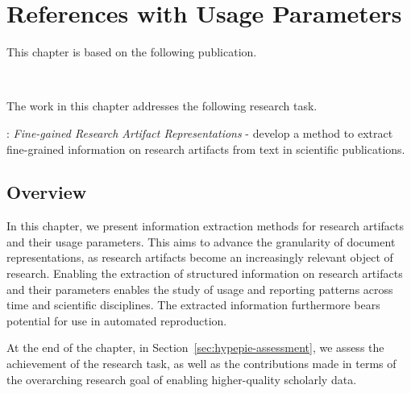 \chapter{References with Usage Parameters}
\label{chp:params}

This chapter is based on the following publication.
\begin{infobox-pub}
\\
\end{infobox-pub}

The work in this chapter addresses the following research task.

\begin{rtlist}
    \item[\rtmark{4}:] \textit{Fine-gained Research Artifact Representations} - develop a method to extract fine-grained information on research artifacts from text in scientific publications.
\end{rtlist}

\section{Overview}
In this chapter, we present information extraction methods for research artifacts and their usage parameters. This aims to advance the granularity of document representations, as research artifacts become an increasingly relevant object of research. Enabling the extraction of structured information on research artifacts and their parameters enables the study of usage and reporting patterns across time and scientific disciplines. The extracted information furthermore bears potential for use in automated reproduction.

At the end of the chapter, in Section~\ref{sec:hypepie-assessment}, we assess the achievement of the research task, as well as the contributions made in terms of the overarching research goal of enabling higher-quality scholarly data.

